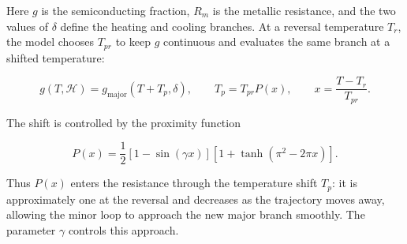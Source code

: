 Here $g$ is the semiconducting fraction, $R_m$ is the metallic resistance,
and the two values of $\delta$ define the heating and cooling branches. At a
reversal temperature $T_r$, the model chooses $T_{pr}$ to keep $g$ continuous
and evaluates the same branch at a shifted temperature:

\begin{equation}
    g(T,\mathcal H)=g_{\mathrm{major}}(T+T_p,\delta),
    \qquad
    T_p=T_{pr}P(x),
    \qquad
    x=\frac{T-T_r}{T_{pr}}.
    \label{eq:almeida_minor_loop}
\end{equation}

The shift is controlled by the proximity function

\begin{equation}
    P(x)=\frac{1}{2}\left[1-\sin(\gamma x)\right]
    \left[1+\tanh\!\left(\pi^2-2\pi x\right)\right].
    \label{eq:almeida_proximity}
\end{equation}

Thus $P(x)$ enters the resistance through the temperature shift $T_p$: it is
approximately one at the reversal and decreases as the trajectory moves away,
allowing the minor loop to approach the new major branch smoothly. The
parameter $\gamma$ controls this approach.
